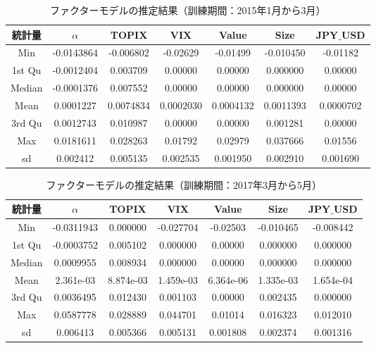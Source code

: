 ﻿\documentclass[11pt]{jreport}
\begin{document}
\begin{table}[H]
\caption{ファクターモデルの推定結果（訓練期間：2015年1月から3月）}
\begin{center}
\begin{tabular}{|c|c|c|c|c|c|c|}
\hline
 統計量& $\alpha$    &         TOPIX   &             VIX      &        Value   &         Size       &        JPY$\_$USD    \\      
\hline
\hline
 Min&-0.0143864& -0.006802& -0.02629 & -0.01499 &-0.010450 &-0.01182 \\
 1st Qu&-0.0012404 & 0.003709 & 0.00000 &  0.00000 & 0.000000 & 0.00000 \\ 
 Median &-0.0001376 & 0.007552 & 0.00000  & 0.00000 & 0.000000 & 0.00000 \\ 
 Mean   &0.0001227& 0.0074834& 0.0002030& 0.0004132& 0.0011393& 0.0000702  \\
 3rd Qu& 0.0012743 & 0.010987 & 0.00000  & 0.00000 & 0.001281 & 0.00000  \\
 Max  &0.0181611 & 0.028263 & 0.01792  & 0.02979 & 0.037666 & 0.01556 \\
\hline
sd & 0.002412  & 0.005135  & 0.002535 &0.001950 &0.002910 & 0.001690 \\
\hline
\end{tabular}
\end{center}
\label{tbl:model_summary1}
\end{table}


\begin{table}[H]
\caption{ファクターモデルの推定結果（訓練期間：2017年3月から5月）}
\begin{center}
\begin{tabular}{|c|c|c|c|c|c|c|}
\hline
 統計量& $\alpha$   &         TOPIX   &             VIX      &        Value   &         Size       &        JPY$\_$USD    \\      
\hline
\hline
 Min&-0.0311943 &0.000000&-0.027704 & -0.02503& -0.010465& -0.008442 \\
 1st Qu&-0.0003752 & 0.005102 & 0.000000  & 0.00000 & 0.000000 & 0.000000 \\ 
 Median &0.0009955 &0.008934 & 0.000000  & 0.00000 & 0.000000 & 0.000000 \\ 
 Mean   &2.361e-03 & 8.874e-03 & 1.459e-03 & 6.364e-06 & 1.335e-03 & 1.654e-04   \\
 3rd Qu&0.0036495 & 0.012430 & 0.001103  & 0.00000 & 0.002435 & 0.000000  \\
 Max   &0.0587778 & 0.028889 & 0.044701  & 0.01014 & 0.016323 & 0.012010 \\
\hline
sd &  0.006413 & 0.005366 & 0.005131 & 0.001808 & 0.002374&  0.001316 \\
\hline
\end{tabular}
\end{center}
\label{tbl:model_summary2}
\end{table}
\end{document}
